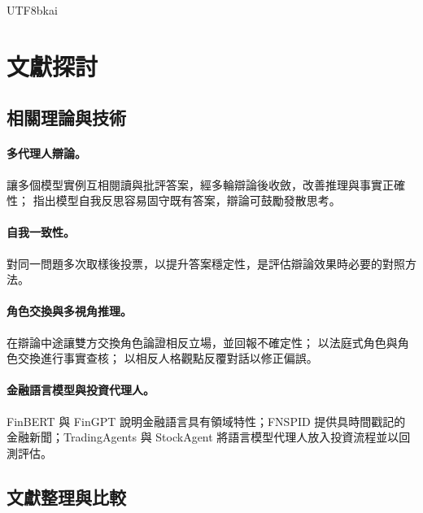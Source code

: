 \documentclass[12pt,a4paper]{article}
\begin{document}
\begin{CJK}{UTF8}{bkai}
\section{文獻探討}

\subsection{相關理論與技術}

\paragraph{多代理人辯論。} \citet{du2023debate} 讓多個模型實例互相閱讀與批評答案，經多輪辯論後收斂，改善推理與事實正確性；\citet{liang2023divergent} 指出模型自我反思容易固守既有答案，辯論可鼓勵發散思考。

\paragraph{自我一致性。} \citet{wang2023selfconsistency} 對同一問題多次取樣後投票，以提升答案穩定性，是評估辯論效果時必要的對照方法。

\paragraph{角色交換與多視角推理。} \citet{liu2025roleswitch} 在辯論中途讓雙方交換角色論證相反立場，並回報不確定性；\citet{chowdhury2026proclaim} 以法庭式角色與角色交換進行事實查核；\citet{chen2026mpt} 以相反人格觀點反覆對話以修正偏誤。

\paragraph{金融語言模型與投資代理人。} FinBERT \citep{araci2019finbert} 與 FinGPT \citep{liu2023fingpt} 說明金融語言具有領域特性；FNSPID \citep{dong2024fnspid} 提供具時間戳記的金融新聞；TradingAgents \citep{xiao2024tradingagents} 與 StockAgent \citep{zhang2024stockagent} 將語言模型代理人放入投資流程並以回測評估。

\subsection{文獻整理與比較}


\end{CJK}
\end{document}

